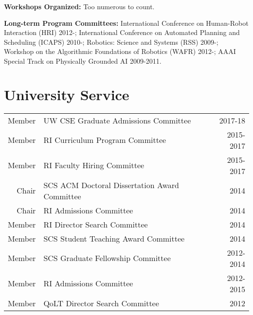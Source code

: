 
\vspace{1em}
\noindent \textbf{Workshops Organized:} Too numerous to count. 


\vspace{1em}
\noindent \textbf{Long-term Program Committees:} 
International Conference on Human-Robot Interaction (HRI) 2012-;
International Conference on Automated Planning and Scheduling (ICAPS) 2010-;
Robotics: Science and Systems (RSS) 2009-; 
Workshop on the Algorithmic Foundations of Robotics (WAFR) 2012-;
AAAI Special Track on Physically Grounded AI 2009-2011.

\section{University Service}
\begin{tabularx}{\linewidth}{rXr}
Member & UW CSE Graduate Admissions Committee & 2017-18 \\
Member & RI Curriculum Program Committee & 2015-2017\\
Member & RI Faculty Hiring Committee & 2015-2017\\
Chair & SCS ACM Doctoral Dissertation Award Committee & 2014\\
Chair & RI Admissions Committee & 2014 \\
Member & RI Director Search Committee & 2014 \\
Member & SCS Student Teaching Award Committee & 2014 \\
Member & SCS Graduate Fellowship Committee & 2012-2014 \\
Member & RI Admissions Committee & 2012-2015 \\
Member & QoLT Director Search Committee & 2012\\
\end{tabularx}
